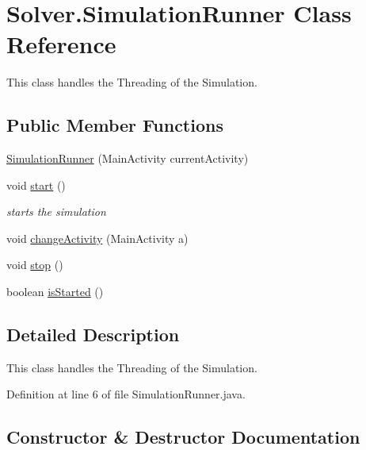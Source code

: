 \hypertarget{classSolver_1_1SimulationRunner}{}\section{Solver.\+Simulation\+Runner Class Reference}
\label{classSolver_1_1SimulationRunner}


This class handles the Threading of the Simulation.  


\subsection*{Public Member Functions}
\begin{DoxyCompactItemize}
\item 
\hyperlink{classSolver_1_1SimulationRunner_a58f6020d625c60b8a04329eced280ca9}{Simulation\+Runner} (Main\+Activity current\+Activity)
\item 
void \hyperlink{classSolver_1_1SimulationRunner_ab34c984e38253223884911c042175426}{start} ()
\begin{DoxyCompactList}\small\item\em starts the simulation \end{DoxyCompactList}\item 
void \hyperlink{classSolver_1_1SimulationRunner_ab44a9a2edd9aec16fe26bb05fa0f1115}{change\+Activity} (Main\+Activity a)
\item 
void \hyperlink{classSolver_1_1SimulationRunner_a9b9b7707ac2d73e32cc86d3d0a609dde}{stop} ()
\item 
boolean \hyperlink{classSolver_1_1SimulationRunner_a6b7b251488a9854ee2221e3fd37e4c26}{is\+Started} ()
\end{DoxyCompactItemize}


\subsection{Detailed Description}
This class handles the Threading of the Simulation. 

Definition at line 6 of file Simulation\+Runner.\+java.



\subsection{Constructor \& Destructor Documentation}
